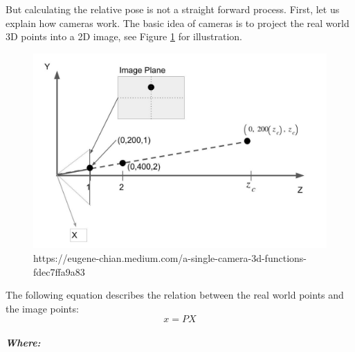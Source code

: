 But calculating the relative pose is not a straight forward process. First, let us explain how cameras work. The basic idea of cameras is to project the real world 3D points into a 2D image, see Figure \ref{camera projection illustration image} for illustration.
\begin{figure}[h] %
	\centering
	\includegraphics[width=\textwidth]{assets/ch3/camera projection illustration image.jpg}
	\caption{https://eugene-chian.medium.com/a-single-camera-3d-functions-fdec7ffa9a83}
	\label{camera projection illustration image}
\end{figure}
The following equation describes the relation between the real world points and the image points:
\begin{equation}
x = PX\label{x = PX}
\end{equation}
\subparagraph{Where:}
